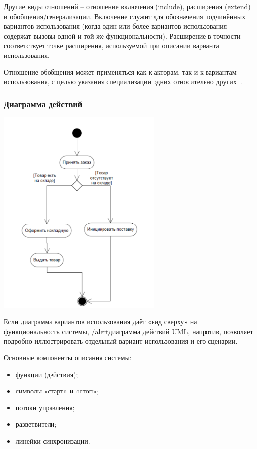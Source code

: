 \documentclass{../industrial-development}
\begin{document}
Другие виды отношений – отношение включения (include), расширения (extend) и
обобщения/генерализации. Включение служит для обозначения подчинённых вариантов использования (когда один или более вариантов использования содержат вызовы одной и той же
функциональности). Расширение в точности соответствует точке расширения, используемой при
описании варианта использования.

Отношение обобщения может применяться как к акторам, так и к вариантам
использования, с целью указания специализации одних относительно других~\cite[с.~46]{Maglinec}.


\begin{frame} \frametitle {Диаграмма действий}
 \centerline{\includegraphics[width=0.6\textwidth]{pict5.pdf}}
\end{frame}

\lecturenotes

Если диаграмма вариантов использования даёт «вид сверху» на функциональность системы, /alert{диаграмма действий UML}, напротив, позволяет подробно иллюстрировать отдельный вариант использования и его сценарии.

Основные компоненты описания системы:
\begin{itemize}
\item функции (действия);
\item символы «старт» и «стоп»;
\item потоки управления;
\item разветвители;
\item линейки синхронизации.
\end{itemize}
\end{document}
